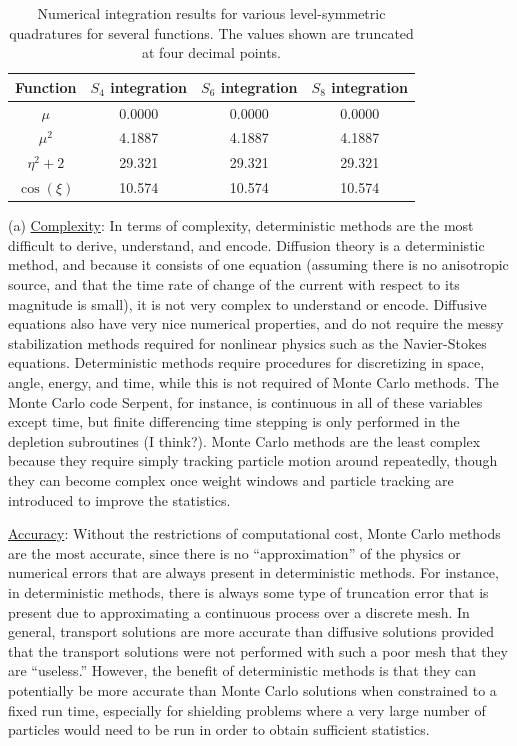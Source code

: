 \documentclass[10pt]{article}
\newcommand*\circled[1]{\tikz[baseline=(char.base)]{
            \node[shape=circle,draw,inner sep=2pt] (char) {#1};}}
\begin{document}
\begin{table}[H]
\caption{Numerical integration results for various level-symmetric quadratures for several functions. The values shown are truncated at four decimal points.}
\centering
\begin{tabular}{c c c c}
\hline\hline
Function & \(S_4\) integration & \(S_6\) integration & \(S_8\) integration\\ [0.5ex]
\hline
\(\mu\) 		& 0.0000 	& 0.0000 	& 0.0000\\
\(\mu^2\)		& 4.1887	& 4.1887	& 4.1887\\
\(\eta^2+2\)	& 29.321	& 29.321	& 29.321\\
\(\cos{(\xi)}\)	& 10.574	& 10.574	& 10.574\\
\hline
\end{tabular}
\label{table:3}
\end{table}

\circled{3} (a) \underline{Complexity}: In terms of complexity, deterministic methods are the most difficult to derive, understand, and encode. Diffusion theory is a deterministic method, and because it consists of one equation (assuming there is no anisotropic source, and that the time rate of change of the current with respect to its magnitude is small), it is not very complex to understand or encode. Diffusive equations also have very nice numerical properties, and do not require the messy stabilization methods required for nonlinear physics such as the Navier-Stokes equations. Deterministic methods require procedures for discretizing in space, angle, energy, and time, while this is not required of Monte Carlo methods. The Monte Carlo code Serpent, for instance, is continuous in all of these variables except time, but finite differencing time stepping is only performed in the depletion subroutines (I think?). Monte Carlo methods are the least complex because they require simply tracking particle motion around repeatedly, though they can become complex once weight windows and particle tracking are introduced to improve the statistics.\newline

\underline{Accuracy}: Without the restrictions of computational cost, Monte Carlo methods are the most accurate, since there is no ``approximation'' of the physics or numerical errors that are always present in deterministic methods. For instance, in deterministic methods, there is always some type of truncation error that is present due to approximating a continuous process over a discrete mesh. In general, transport solutions are more accurate than diffusive solutions provided that the transport solutions were not performed with such a poor mesh that they are ``useless.'' However, the benefit of deterministic methods is that they can potentially be more accurate than Monte Carlo solutions when constrained to a fixed run time, especially for shielding problems where a very large number of particles would need to be run in order to obtain sufficient statistics.\newline
\end{document}
